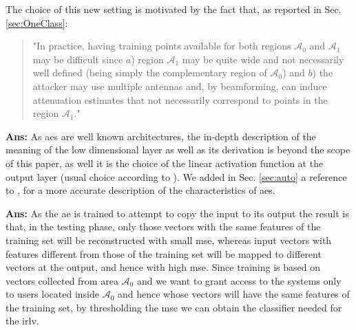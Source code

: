 \documentclass[draftcls,onecolumn,12pt]{IEEEtran}
\newcommand{\A}[1]{\mathcal{A}_#1}
\begin{document}
The choice of this new setting is motivated by the fact that, as reported in Sec. \ref{sec:OneClass}:
\begin{quote}
"In practice, having training points available for both regions $\mathcal A_0$ and ${\mathcal A}_1$ may be difficult since $a$) region $\A{1}$ may be quite wide and not necessarily well defined (being simply the complementary region of $\mathcal A_0$) and $b$) the attacker may use multiple antennas and, by beamforming, can induce attenuation estimates that not necessarily correspond to points in the region $\A{1}$."
\end{quote}


\vspace{5mm} %
\begin{framed}
\end{framed}

{\bf Ans:} As \acp{ae} are well known architectures, the in-depth description of the meaning of the low dimensional layer as well as its derivation is beyond the scope of this paper, as well it is the choice of the linear activation function at the output layer (usual choice according to \cite[Chapter 14]{Goodfellow}). We added in Sec. \ref{sec:auto} a reference to \cite[Chapter 14]{Goodfellow}, for a more accurate description of the characteristics of \acp{ae}.

\vspace{5mm} %
\begin{framed}
\end{framed}

{\bf Ans:} As the \ac{ae} is trained to attempt to copy the input to its output the result is that, in the testing phase, only those vectors with the same features of the training set will be reconstructed with small \ac{mse}, whereas input vectors with features different from those of the training set will be mapped to different vectors at the output, and hence with high \ac{mse}. Since training is based on vectors collected from area $\mathcal{A}_0$ and we want to grant access to the systems only to users located inside $\mathcal{A}_0$ and hence whose vectors will have the same features of the training set, by thresholding the \ac{mse} we can obtain the classifier needed for the \ac{irlv}.
\end{document}
